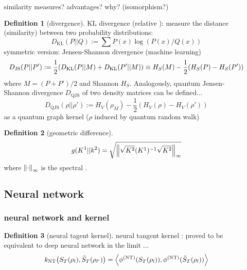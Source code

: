 \documentclass[
10pt,
aps,
pra,
linenumbers,
floatfix,
]{revtex4-2}
\theoremstyle{plain}
\theoremstyle{definition}
\newtheorem{definition}{Definition}
\newcommand{\jsd}{D_\text{JS}}
\newcommand{\qjs}{\text{QJS}}
\newcommand{\kl}{D_\text{KL}}
\newcommand{\ntk}{\textup{NT}}
\newcommand{\dm}{\rho}
\begin{document}
similarity measures? advantages? why? (isomorphism?)
\begin{definition}[divergence]\label{def:divergence}
	KL divergence (relative ): measure the distance (similarity) between two probability distributions:
	\begin{equation}
		\kl (P || Q) := \sum P(x) \log (P(x)/Q(x))
	\end{equation}
	symmetric version: Jensen-Shannon divergence (machine learning)
	\begin{equation}
		\jsd (P || P') := \frac{1}{2} \qty(\kl(P|| M) + \kl(P'||M))
		\equiv H_S(M)-\frac{1}{2} (H_S(P) - H_S(P') ) 
	\end{equation}
	where $M=(P+P')/2$ and Shannon  $H_S$.
	Analogously, quantum Jensen-Shannon divergence $D_{\qjs}$ of two density matrices can be defined...
	\begin{equation}
		D_{\qjs}(\dm||\dm'):= 
		H_V(\dm_M) - \frac{1}{2} (H_V(\dm) - H_V(\dm') ) 
	\end{equation}
	as a quantum graph kernel ($\dm$ induced by quantum random walk)
\end{definition}
\begin{definition}[geometric difference]\label{def:geometric_difference}
	\begin{equation}
		g(K^1|| k^2) = \sqrt{\norm{\sqrt{K^2} (K^1)^{-1}\sqrt{K^2}}_{\infty}}
	\end{equation}
	where $\norm{\cdot}_{\infty}$ is the spectral .
\end{definition}

\subsection{Neural network}\label{sec:neural_network}
\subsubsection{neural network and kernel}
\begin{definition}[neural tagent kernel]\label{def:neural_tangent_kernel}
	neural tangent kernel \cite{jacotNeuralTangentKernel2020}: proved to be equivalent to deep neural network \cite{gaoEfficientRepresentationQuantum2017} in the limit ...
	\begin{equation}
		k_{\ntk} \qty(S_T(\dm_l),\tilde{S}_T(\dm_{l'}))
		=
		\expval{
			\phi^{(\ntk)}(S_T(\dm_l)),
			\phi^{(\ntk)}(\tilde{S}_T(\dm_l))
		}
	\end{equation}
\end{definition}
\end{document}
